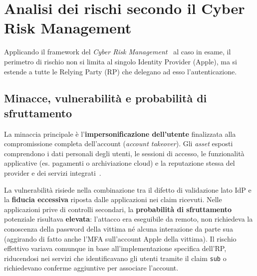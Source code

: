 \section{Analisi dei rischi secondo il Cyber Risk Management}
\label{sec:episodi}

Applicando il framework del \emph{Cyber Risk Management}~\cite{nist800-30} al caso in esame, il perimetro di rischio non si limita al singolo Identity Provider (Apple), ma si estende a tutte le Relying Party (RP) che delegano ad esso l'autenticazione.

\subsection{Minacce, vulnerabilità e probabilità di sfruttamento}
La minaccia principale è l'\textbf{impersonificazione dell'utente} finalizzata alla compromissione completa dell'account (\emph{account takeover}). Gli \emph{asset} esposti comprendono i dati personali degli utenti, le sessioni di accesso, le funzionalità applicative (es. pagamenti o archiviazione cloud) e la reputazione stessa del provider e dei servizi integrati~\cite{goodin2020}.

La vulnerabilità risiede nella combinazione tra il difetto di validazione lato IdP e la \textbf{fiducia eccessiva} riposta dalle applicazioni nei claim ricevuti. Nelle applicazioni prive di controlli secondari, la \textbf{probabilità di sfruttamento} potenziale risultava \textbf{elevata}: l'attacco era eseguibile da remoto, non richiedeva la conoscenza della password della vittima né alcuna interazione da parte sua (aggirando di fatto anche l'MFA sull'account Apple della vittima). Il rischio effettivo variava comunque in base all'implementazione specifica dell'RP, riducendosi nei servizi che identificavano gli utenti tramite il claim \texttt{sub} o richiedevano conferme aggiuntive per associare l'account.

